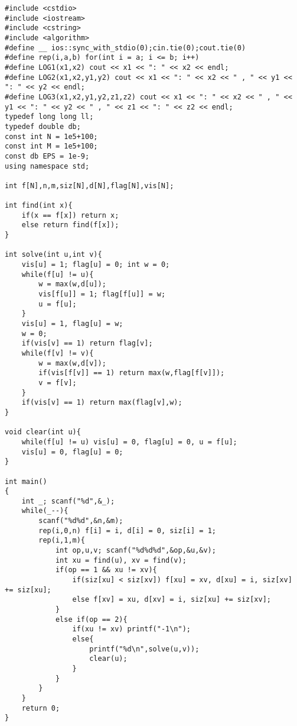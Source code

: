 \documentclass[twoside]{article}
\begin{document}
\begin{lstlisting}
#include <cstdio>
#include <iostream>
#include <cstring>
#include <algorithm>
#define __ ios::sync_with_stdio(0);cin.tie(0);cout.tie(0)
#define rep(i,a,b) for(int i = a; i <= b; i++)
#define LOG1(x1,x2) cout << x1 << ": " << x2 << endl;
#define LOG2(x1,x2,y1,y2) cout << x1 << ": " << x2 << " , " << y1 << ": " << y2 << endl;
#define LOG3(x1,x2,y1,y2,z1,z2) cout << x1 << ": " << x2 << " , " << y1 << ": " << y2 << " , " << z1 << ": " << z2 << endl;
typedef long long ll;
typedef double db;
const int N = 1e5+100;
const int M = 1e5+100;
const db EPS = 1e-9;
using namespace std;

int f[N],n,m,siz[N],d[N],flag[N],vis[N];

int find(int x){
	if(x == f[x]) return x;
	else return find(f[x]);
}

int solve(int u,int v){
	vis[u] = 1; flag[u] = 0; int w = 0;
	while(f[u] != u){
		w = max(w,d[u]);
		vis[f[u]] = 1; flag[f[u]] = w;
		u = f[u];
	}
	vis[u] = 1, flag[u] = w;
	w = 0;
	if(vis[v] == 1) return flag[v];
	while(f[v] != v){
		w = max(w,d[v]);
		if(vis[f[v]] == 1) return max(w,flag[f[v]]);
		v = f[v];
	}
	if(vis[v] == 1) return max(flag[v],w);
}

void clear(int u){
	while(f[u] != u) vis[u] = 0, flag[u] = 0, u = f[u];
	vis[u] = 0, flag[u] = 0;
}

int main()
{
	int _; scanf("%d",&_);
	while(_--){
		scanf("%d%d",&n,&m);
		rep(i,0,n) f[i] = i, d[i] = 0, siz[i] = 1;
		rep(i,1,m){
			int op,u,v; scanf("%d%d%d",&op,&u,&v);
			int xu = find(u), xv = find(v);
			if(op == 1 && xu != xv){
				if(siz[xu] < siz[xv]) f[xu] = xv, d[xu] = i, siz[xv] += siz[xu];
				else f[xv] = xu, d[xv] = i, siz[xu] += siz[xv];
			}
			else if(op == 2){
				if(xu != xv) printf("-1\n");
				else{
					printf("%d\n",solve(u,v));
					clear(u);
				}
			}
		}
	}
	return 0;
}
\end{lstlisting}
\end{document}
